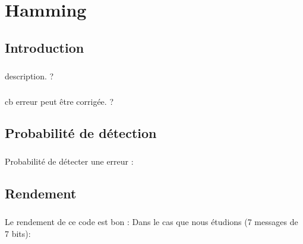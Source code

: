 
\chapter{Hamming}

    \section{Introduction}

        \paragraph{}
description. ?
        \paragraph{}
cb erreur peut être corrigée. ?


    \section{Probabilité de détection}

        \paragraph{}
Probabilité de détecter une erreur :


    \section{Rendement}

        \paragraph{}
Le rendement de ce code est bon :
Dans le cas que nous étudions (7 messages de 7 bits):
